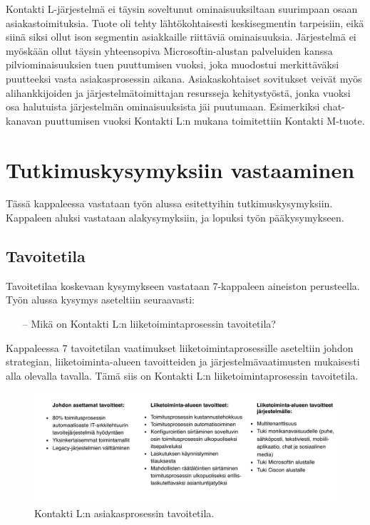 \documentclass[finnish,12pt,a4paper,pdftex]{article}
\begin{document}
\noindent Kontakti L-järjestelmä ei täysin soveltunut ominaisuuksiltaan suurimpaan osaan asiakastoimituksia. Tuote oli tehty lähtökohtaisesti keskisegmentin tarpeisiin, eikä siinä siksi ollut ison segmentin asiakkaille riittäviä ominaisuuksia. Järjestelmä ei myöskään ollut täysin yhteensopiva Microsoftin-alustan palveluiden kanssa pilviominaisuuksien tuen puuttumisen vuoksi, joka muodostui merkittäväksi puutteeksi vasta asiakasprosessin aikana. Asiakaskohtaiset sovitukset veivät myös alihankkijoiden ja järjestelmätoimittajan resursseja kehitystyöstä, jonka vuoksi osa halutuista järjestelmän ominaisuuksista jäi puutumaan. Esimerkiksi chat-kanavan puuttumisen vuoksi Kontakti L:n mukana toimitettiin Kontakti M-tuote.\\

\clearpage

\section{Tutkimuskysymyksiin vastaaminen}
Tässä kappaleessa vastataan työn alussa esitettyihin tutkimuskysymyksiin. Kappaleen aluksi vastataan alakysymyksiin, ja lopuksi työn pääkysymykseen.

\subsection{Tavoitetila}

Tavoitetilaa koskevaan kysymykseen vastataan 7-kappaleen aineiston perusteella. Työn alussa kysymys aseteltiin seuraavasti:
\begin{itemize}
    \item [--] Mikä on Kontakti L:n liiketoimintaprosessin tavoitetila?
\end{itemize}

\noindent Kappaleessa 7 tavoitetilan vaatimukset liiketoimintaprosessille aseteltiin johdon strategian, liiketoiminta-alueen tavoitteiden ja järjestelmävaatimusten mukaisesti alla olevalla tavalla. Tämä siis on Kontakti L:n liiketoimintaprosessin tavoitetila.\\
\begin{figure}[!h]
    \centering
    \includegraphics[scale=0.8]{images/tavoitteett.pdf}
    \caption{Kontakti L:n asiakasprosessin tavoitetila.}
    \label{fig:tavoitteet}
\end{figure}
\end{document}
